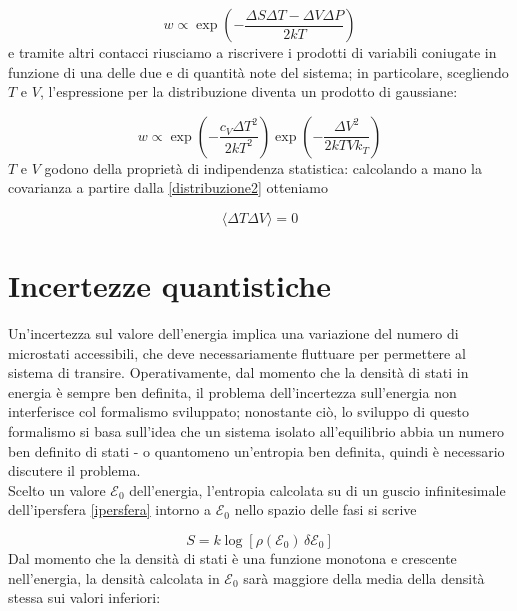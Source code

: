 \documentclass[a4paper]{report}
\begin{document}
\begin{equation}
    w \propto \exp\left(-\frac{\Delta S \Delta T - \Delta V \Delta P}{2 k T}\right)
\end{equation}
e tramite altri contacci riusciamo a riscrivere i prodotti di variabili coniugate in funzione di una delle due e di quantità note del sistema; in particolare, scegliendo $T$ e $V$, l'espressione per la distribuzione diventa un prodotto di gaussiane:

\begin{equation}
w \propto \exp \left(-\frac{c_V \Delta T^2}{2 k T^2}\right)\exp \left(-\frac{\Delta V^2}{2 k T V k_T}\right)
\label{distribuzione2}
\end{equation}
$T$ e $V$ godono della proprietà di indipendenza statistica: calcolando a mano la covarianza a partire dalla \eqref{distribuzione2} otteniamo

\begin{equation}
    \langle \Delta T \Delta V \rangle = 0
\end{equation}


\section{Incertezze quantistiche}

Un'incertezza sul valore dell'energia implica una variazione del numero di microstati accessibili, che deve necessariamente fluttuare per permettere al sistema di transire. Operativamente, dal momento che la densità di stati in energia è sempre ben definita, il problema dell'incertezza sull'energia non interferisce col formalismo sviluppato; nonostante ciò, lo sviluppo di questo formalismo si basa sull'idea che un sistema isolato all'equilibrio abbia un numero ben definito di stati - o quantomeno un'entropia ben definita, quindi è necessario discutere il problema.\\
Scelto un valore $\mathcal{E}_0$ dell'energia, l'entropia calcolata su di un guscio infinitesimale dell'ipersfera \eqref{ipersfera} intorno a $\mathcal{E}_0$ nello spazio delle fasi si scrive

\begin{equation}
S = k \log \left[\rho(\mathcal{E}_0)\,\delta\mathcal{E}_0\right]
\end{equation}
Dal momento che la densità di stati è una funzione monotona e crescente nell'energia, la densità calcolata in $\mathcal{E}_0$ sarà maggiore della media della densità stessa sui valori inferiori:
\end{document}
